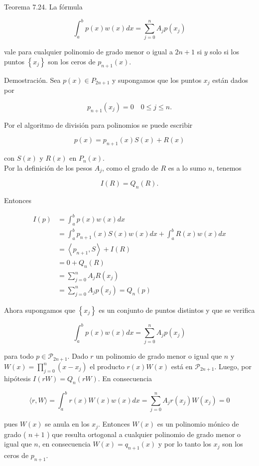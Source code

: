 \documentclass[10pt]{book}
\begin{document}
Teorema 7.24. La fórmula

$$
\int_{a}^{b} p(x) w(x) d x=\sum_{j=0}^{n} A_{j} p\left(x_{j}\right)
$$

vale para cualquier polinomio de grado menor o igual a $2 n+1$ si $y$ solo si los puntos $\left\{x_{j}\right\}$ son los ceros de $p_{n+1}(x)$.

Demostración. Sea $p(x) \in P_{2 n+1}$ y supongamos que los puntos $x_{j}$ están dados por

$$
p_{n+1}\left(x_{j}\right)=0 \quad 0 \leq j \leq n .
$$

Por el algoritmo de división para polinomios se puede escribir

$$
p(x)=p_{n+1}(x) S(x)+R(x)
$$

con $S(x)$ y $R(x)$ en $P_{n}(x)$.\\
Por la definición de los pesos $A_{j}$, como el grado de $R$ es a lo sumo $n$, tenemos

$$
I(R)=Q_{n}(R) .
$$

Entonces

$$
\begin{aligned}
I(p) & =\int_{a}^{b} p(x) w(x) d x \\
& =\int_{a}^{b} p_{n+1}(x) S(x) w(x) d x+\int_{a}^{b} R(x) w(x) d x \\
& =\left\langle p_{n+1}, S\right\rangle+I(R) \\
& =0+Q_{n}(R) \\
& =\sum_{j=0}^{n} A_{j} R\left(x_{j}\right) \\
& =\sum_{j=0}^{n} A_{j} p\left(x_{j}\right)=Q_{n}(p)
\end{aligned}
$$

Ahora supongamos que $\left\{x_{j}\right\}$ es un conjunto de puntos distintos y que se verifica

$$
\int_{a}^{b} p(x) w(x) d x=\sum_{j=0}^{n} A_{j} p\left(x_{j}\right)
$$

para todo $p \in \mathcal{P}_{2 n+1}$. Dado $r$ un polinomio de grado menor o igual que $n$ y $W(x)=\prod_{j=0}^{n}\left(x-x_{j}\right)$ el producto $r(x) W(x)$ está en $\mathcal{P}_{2 n+1}$. Luego, por hipótesis $I(r W)=Q_{n}(r W)$. En consecuencia

$$
\langle r, W\rangle=\int_{a}^{b} r(x) W(x) w(x) d x=\sum_{j=0}^{n} A_{j} r\left(x_{j}\right) W\left(x_{j}\right)=0
$$

pues $W(x)$ se anula en los $x_{j}$. Entonces $W(x)$ es un polinomio mónico de grado ( $n+1$ ) que resulta ortogonal a cualquier polinomio de grado menor o igual que $n$, en consecuencia $W(x)=q_{n+1}(x)$ y por lo tanto los $x_{j}$ son los ceros de $p_{n+1}$.
\end{document}
